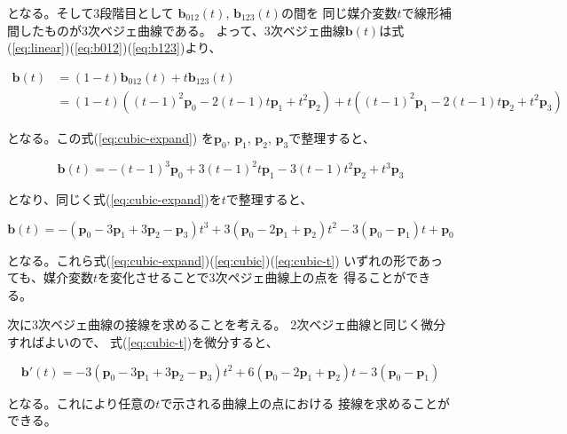\documentclass[dvipdfmx]{jsarticle}
\newcommand\VectBold[1]{\boldsymbol{#1}}
\newcommand\VectBold[1]{\symbf{#1}}
\newcommand\Vect[1]{\VectBold{#1}}
\begin{document}
となる。そして3段階目として
$\Vect{b}_{012}\left(t\right)$, $\Vect{b}_{123}\left(t\right)$の間を
同じ媒介変数$t$で線形補間したものが3次ベジェ曲線である。
よって、3次ベジェ曲線$\Vect{b}\left(t\right)$は式
(\ref{eq:linear})(\ref{eq:b012})(\ref{eq:b123})より、

\begin{align}
  \Vect{b}\left(t\right)
  &=
  \left(1-t\right)\Vect{b}_{012}\left(t\right)
  + t\Vect{b}_{123}\left(t\right) \\
  &=
  \left(1-t\right)\left(
  \left(t-1\right)^2 \Vect{p}_0
  - 2\left(t-1\right)t \Vect{p}_1
  + t^2 \Vect{p}_2
  \right)
  + t\left(
  \left(t-1\right)^2 \Vect{p}_1
  - 2\left(t-1\right)t \Vect{p}_2
  + t^2 \Vect{p}_3
  \right)
  \label{eq:cubic-expand}
\end{align}

となる。この式(\ref{eq:cubic-expand})
を$\Vect{p}_0$, $\Vect{p}_1$, $\Vect{p}_2$, $\Vect{p}_3$で整理すると、

\begin{equation}
  \Vect{b}\left(t\right)
  =
  - \left(t-1\right)^3 \Vect{p}_0
  + 3\left(t-1\right)^2t \Vect{p}_1
  - 3\left(t-1\right)t^2 \Vect{p}_2
  + t^3 \Vect{p}_3
  \label{eq:cubic}
\end{equation}

となり、同じく式(\ref{eq:cubic-expand})を$t$で整理すると、

\begin{equation}
  \Vect{b}\left(t\right)
  =
  - \left( \Vect{p}_0-3\Vect{p}_1+3\Vect{p}_2-\Vect{p}_3 \right)t^3
  + 3\left( \Vect{p}_0-2\Vect{p}_1+\Vect{p}_2 \right)t^2
  - 3\left( \Vect{p}_0-\Vect{p}_1 \right)t
  + \Vect{p}_0
  \label{eq:cubic-t}
\end{equation}

となる。これら式(\ref{eq:cubic-expand})(\ref{eq:cubic})(\ref{eq:cubic-t})%
いずれの形であっても、媒介変数$t$を変化させることで3次ペジェ曲線上の点を
得ることができる。

次に3次ベジェ曲線の接線を求めることを考える。
2次ベジェ曲線と同じく微分すればよいので、
式(\ref{eq:cubic-t})を微分すると、

\begin{equation}
  \Vect{b}'\left(t\right)
  =
  -3\left( \Vect{p}_0 -3\Vect{p}_1 +3\Vect{p}_2 -\Vect{p}_3 \right) t^2
  +6\left( \Vect{p}_0 -2\Vect{p}_1 +\Vect{p}_2 \right) t
  -3\left( \Vect{p}_0 - \Vect{p}_1 \right)
  \label{eq:cubic-d}
\end{equation}

となる。これにより任意の$t$で示される曲線上の点における
接線を求めることができる。
\end{document}
